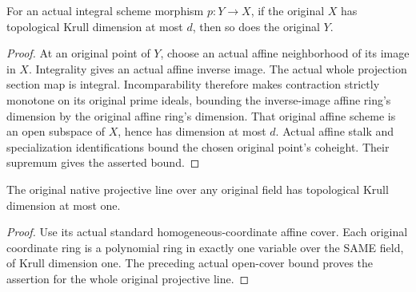 \begin{lemma}
\label{lem:actual-integral-projection-dimension-bound}
\leanok
For an actual integral scheme morphism $p:Y\to X$, if the original
$X$ has topological Krull dimension at most $d$, then so does the
original $Y$.
\end{lemma}
\begin{proof}
At an original point of $Y$, choose an actual affine neighborhood of
its image in $X$. Integrality gives an actual affine inverse image.
The actual whole projection section map is integral. Incomparability
therefore makes contraction strictly monotone on its original prime
ideals, bounding the inverse-image affine ring's dimension by the
original affine ring's dimension. That original affine scheme is an
open subspace of $X$, hence has dimension at most $d$. Actual affine
stalk and specialization identifications bound the chosen original
point's coheight. Their supremum gives the asserted bound.
\end{proof}

\begin{lemma}
\label{lem:actual-native-projective-line-dimension-bound}
\leanok
The original native projective line over any original field has
topological Krull dimension at most one.
\end{lemma}
\begin{proof}
Use its actual standard homogeneous-coordinate affine cover. Each
original coordinate ring is a polynomial ring in exactly one
variable over the SAME field, of Krull dimension one. The preceding
actual open-cover bound proves the assertion for the whole original
projective line.
\end{proof}
